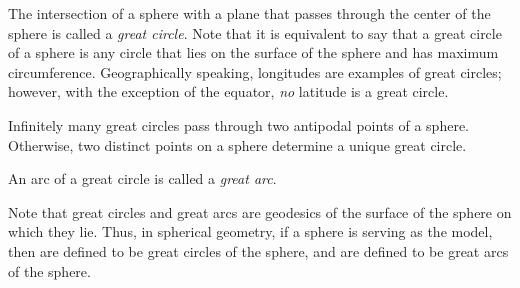 \documentclass[12pt]{article}
\begin{document}
The intersection of a sphere with a plane that passes through the center of the sphere is called a \emph{great circle}.  Note that it is equivalent to say that a great circle of a sphere is any circle that lies on the surface of the sphere and has maximum circumference.  Geographically speaking, longitudes are examples of great circles; however, with the exception of the equator, \emph{no} latitude is a great circle.

Infinitely many great circles pass through two antipodal points of a sphere.  Otherwise, two distinct points on a sphere determine a unique great circle.

An arc of a great circle is called a \emph{great arc}.

Note that great circles and great arcs are geodesics of the surface of the sphere on which they lie.  Thus, in spherical geometry, if a sphere is serving as the model, then  are defined to be great circles of the sphere, and  are defined to be great arcs of the sphere.
\end{document}
